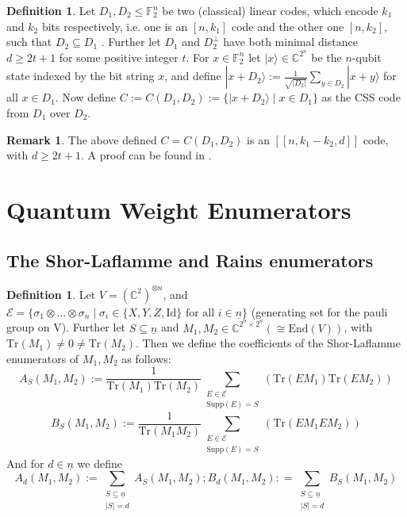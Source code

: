 \documentclass{article}
\def\F{\mathbb{F}}
\def\C{\mathbb{C}}
\def\supp{\text{Supp}}
\def\fa{\text{ for all }}
\def\Tr{\text{Tr}}
\def\Id{\text{Id}}
\theoremstyle{definition}
\newtheorem{rem}[Satz]{Remark}
\newtheorem{defn}[Satz]{Definition}
\begin{document}
\begin{defn}

  Let $D_1, D_2 \leq \F_{2}^n $ be two (classical) linear codes, which encode $k_1$ and $k_2$ bits respectively, i.e. one is an  $[n,k_1]$ code and the other one $[n,k_2]$, such that $D_2 \subseteq D_1$ . Further let $D_1$ and $D_2^{\perp}$ have both minimal distance $d \geq 2t+1$ for some positive integer $t$.
  For $ x \in \F_{2}^n$ let $ |x \rangle \in \C^{2^n}$ be the $n$-qubit state indexed by the bit string $x$, and define $ | x + D_2 \rangle := \frac{1}{\sqrt{|D_2|}} \sum_{y \in D_2} | x + y \rangle$ for all $x \in D_1$.
  Now define $C := C (D_1,D_2) := \{ | x + D_2 \rangle \mid x \in D_1 \}$ as the CSS code from $D_1$ over $D_2$. 
\end{defn}

\begin{rem}
  The above defined $C = C(D_1,D_2)$ is an $[[n,k_1 - k_2,d]]$ code, with $d \geq 2t+1$. A proof can be found in \cite{NC}.
 \end{rem}

\clearpage \newpage
\section{Quantum Weight Enumerators}

\subsection{The Shor-Laflamme and Rains enumerators}


\begin{defn}\label{shorLaflamme}
Let $V = (\C^2)^{\otimes n}$, and $\mathcal{E} = \{ \sigma_1 \otimes \ldots \otimes \sigma_n \mid \sigma_i \in \{X,Y,Z,\Id \} \fa i \in \underline{n} \}$ (generating set for the pauli group on V). Further let $S \subseteq \underline{n}$ and $M_1, M_2 \in \C^{2^n \times 2^n} (\cong \text{End}(V))$, with $\Tr(M_1) \neq 0 \neq \Tr(M_2)$.
Then we define the coefficients of the Shor-Laflamme enumerators \cite{shor-Laflamme} of $M_1, M_2$ as follows:
\begin{equation} A_S(M_1,M_2) := \frac{1}{\Tr(M_1)\Tr(M_2)}\sum_{\substack{E \in \mathcal{E} \\ \supp(E) = S}}(\Tr(E M_1)\Tr(E M_2)) \end{equation}
\begin{equation} B_S(M_1,M_2) := \frac{1}{\Tr(M_1 M_2)} \sum_{\substack{E \in \mathcal{E} \\ \supp(E) = S}}(\Tr(E M_1 E M_2)) \end{equation}
And for $d \in \underline{n}$ we define
\begin{equation} A_d(M_1,M_2) := \sum_{\substack{ S \subseteq \underline{n} \\ |S| = d}} A_S(M_1,M_2) ; B_d(M_1,M_2): = \sum_{\substack{ S \subseteq \underline{n} \\ |S| = d}} B_S(M_1,M_2) \end{equation}
\end{defn}
\end{document}
